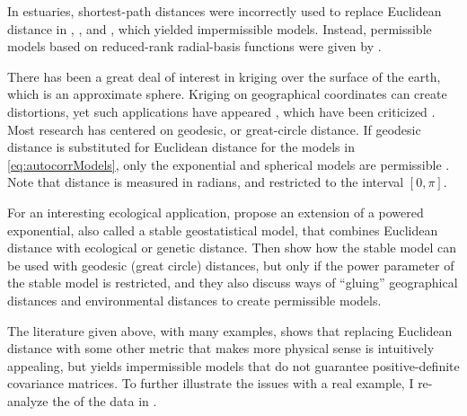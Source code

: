 \documentclass[11pt, titlepage]{article}\usepackage[]{graphicx}\usepackage[]{color}
\begin{document}
\begin{spacing}{1.9}
\begin{flushleft}
In estuaries, shortest-path distances were incorrectly used to replace Euclidean distance in \citet{Litt:Edwa:Port:krig:1997}, \citet{Rath:spat:1998}, and \citet{Jens:Chri:Mill:land:2006}, which yielded impermissible models.  Instead, permissible models based on reduced-rank radial-basis functions were given by \citet{Wang:Rana:low:2007}.

There has been a great deal of interest in kriging over the surface of the earth, which is an approximate sphere.  Kriging on geographical coordinates can create distortions, yet such applications have appeared \citep{Ecke:Gelf:baye:1997,Kalu:Vega:Card:Shel:anal:1998}, which have been criticized \citep{Bane:geod:2005}. Most research has centered on geodesic, or great-circle distance. If geodesic distance is substituted for Euclidean distance for the models in \ref{eq:autocorrModels}, only the exponential and spherical models are permissible \citep{Gnei:stri:2013}.  Note that distance is measured in radians, and restricted to the interval $[0,\pi]$.

For an interesting ecological application, \citet{Brad:Ralp:Coop:dise:2013} propose an extension of a powered exponential, also called a stable geostatistical model, that combines Euclidean distance with ecological or genetic distance. Then \citet{Guil:Schi:Porc:Bevi:vali:2014} show how the stable model can be used with geodesic (great circle) distances, but only if the power parameter of the stable model is restricted, and they also discuss ways of ``gluing'' geographical distances and environmental distances to create permissible models.

The literature given above, with many examples, shows that replacing Euclidean distance with some other metric that makes more physical sense is intuitively appealing, but yields impermissible models that do not guarantee positive-definite covariance matrices. To further illustrate the issues with a real example, I re-analyze the of the data in \citet{Ladl:Avga:Whea:Boyc:pred:2016}. 






\end{flushleft}
\end{spacing}
\end{document}
